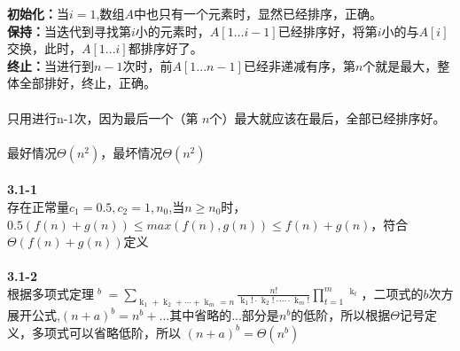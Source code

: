 \documentclass[UTF8]{ctexart}
\begin{document}
\textbf{初始化：}当$i=1$,数组$A$中也只有一个元素时，显然已经排序，正确。\\
\textbf{保持：}当迭代到寻找第$i$小的元素时，$A[1...i-1]$已经排序好，将第$i$小的与$A[i]$交换，此时，$A[1...i]$都排序好了。\\
\textbf{终止：}当进行到$n-1$次时，前$A[1...n-1]$已经非递减有序，第$n$个就是最大，整体全部排好，终止，正确。\\
\\只用进行n-1次，因为最后一个（第 $n$个）最大就应该在最后，全部已经排序好。\\
\\最好情况$\Theta(n^2)$，最坏情况$\Theta(n^2)$\\
\\
\textbf{3.1-1}\\
存在正常量$c_1=0.5, c_2=1, n_0$,当$n\ge n_0$时，$0.5(f(n)+g(n))\le max(f(n),g(n))\le f(n)+g(n)$，符合$\Theta(f(n)+g(n))$定义\\
\\
\textbf{3.1-2}\\
根据多项式定理$\mathop{{ \left( {\mathop{{x}}\nolimits_{{1}}+\mathop{{x}}\nolimits_{{2}}+ \cdots +\mathop{{x}}\nolimits_{{m}}} \right) }}\nolimits^{{b}}=\mathop{ \sum }\limits_{{\mathop{{k}}\nolimits_{{1}}+\mathop{{k}}\nolimits_{{2}}+ \cdots +\mathop{{k}}\nolimits_{{m}}=n}}\frac{{n!}}{{\mathop{{k}}\nolimits_{{1}}! \cdot \mathop{{k}}\nolimits_{{2}}! \cdot  \cdots  \cdot \mathop{{k}}\nolimits_{{m}}!}}\mathop{ \prod }\limits_{{t=1}}^{{m}}\mathop{{\mathop{{x}}\nolimits_{{t}}}}\nolimits^{{\mathop{{k}}\nolimits_{{t}}}}
$，二项式的$b$次方展开公式,$(n+a)^b=n^b+...$其中省略的...部分是$n^b$的低阶，所以根据$\Theta$记号定义，多项式可以省略低阶，所以 $(n+a)^b=\Theta (n^b)$
\end{document}
